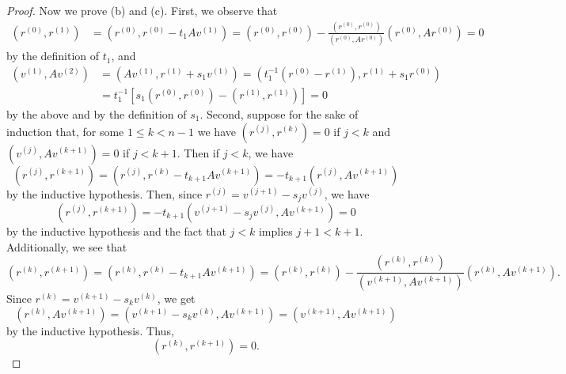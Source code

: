 \documentclass{homework}
\newcommand{\pow}[1]{^{\left(#1\right)}}
\begin{document}
\begin{proof}
		Now we prove (b) and (c). First, we observe that
		\begin{equation*}
			\begin{aligned}
				\left(r\pow{0}, r\pow{1}\right) &= \left(r\pow{0}, r\pow{0} - t_1Av\pow{1}\right) = \left(r\pow{0}, r\pow{0}\right) - \frac{\left(r\pow{0}, r\pow{0}\right)}{\left(r\pow{0}, Ar\pow{0}\right)}\left(r\pow{0}, Ar\pow{0}\right) = 0
			\end{aligned}
		\end{equation*}
		by the definition of $t_1$, and
		\begin{equation*}
		\begin{aligned}
			\left(v\pow{1}, Av\pow{2}\right) &= \left(Av\pow{1}, r\pow{1} + s_1v\pow{1}\right) = \left(t_1^{-1}\left(r\pow{0} - r\pow{1}\right), r\pow{1} + s_1r\pow{0}\right) \\
			&= t_1^{-1}\left[s_1\left(r\pow{0}, r\pow{0}\right) - \left(r\pow{1}, r\pow{1}\right)\right] = 0
		\end{aligned}
		\end{equation*}
		by the above and by the definition of $s_1$.
		Second, suppose for the sake of induction that, for some $1 \le k < n-1$ we have $\left(r\pow{j}, r\pow{k}\right) = 0$ if $j < k$ and $\left(v\pow{j}, Av\pow{k+1}\right) = 0$ if $j < k+1$. Then if $j < k$, we have
		\begin{equation*}
			\left(r\pow{j}, r\pow{k+1}\right) = \left(r\pow{j}, r\pow{k} - t_{k+1}Av\pow{k+1}\right) = -t_{k+1}\left(r\pow{j}, Av\pow{k+1}\right)
		\end{equation*}
		by the inductive hypothesis. Then, since $r\pow{j} = v\pow{j+1} - s_jv\pow{j}$, we have
		\begin{equation*}
			\left(r\pow{j}, r\pow{k+1}\right) = -t_{k+1}\left(v\pow{j+1} - s_jv\pow{j}, Av\pow{k+1}\right) = 0
		\end{equation*}
		by the inductive hypothesis and the fact that $j< k$ implies $j+1 <k+1$. Additionally, we see that
		\begin{equation*}
			\left(r\pow{k}, r\pow{k+1}\right) = \left(r\pow{k}, r\pow{k}- t_{k+1}Av\pow{k+1}\right) = \left(r\pow{k}, r\pow{k}\right) - \frac{\left(r\pow{k}, r\pow{k}\right)}{\left(v\pow{k+1}, Av\pow{k+1}\right)}\left(r\pow{k}, Av\pow{k+1}\right).
		\end{equation*}
		Since $r\pow{k} = v\pow{k+1} - s_kv\pow{k}$, we get
		\begin{equation*}
			\left(r\pow{k}, Av\pow{k+1}\right) = \left(v\pow{k+1} - s_kv\pow{k}, Av\pow{k+1}\right) = \left(v\pow{k+1}, Av\pow{k+1}\right)
		\end{equation*}
		by the inductive hypothesis. Thus,
		\begin{equation*}
			\left(r\pow{k}, r\pow{k+1}\right) = 0.
		\end{equation*}
		

\end{proof}
\end{document}
